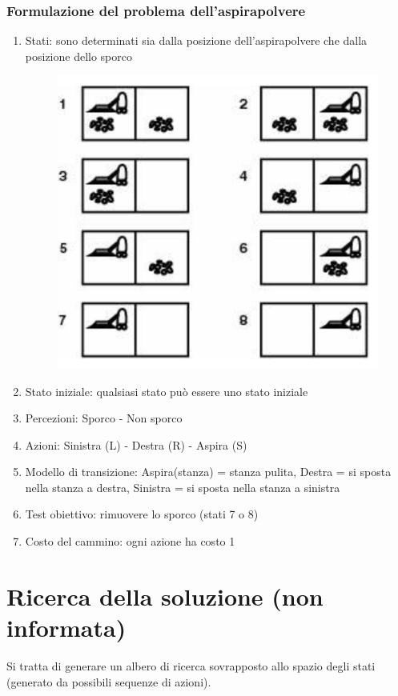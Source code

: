 \documentclass{article}
\begin{document}
\subsubsection{Formulazione del problema dell'aspirapolvere}
\begin{enumerate}
    \item Stati: sono determinati sia dalla posizione dell'aspirapolvere che dalla posizione dello sporco
        \begin{figure}[H]
            \centering
            \includegraphics[scale=0.25]{Images/statiaspirapolvere.png}
        \end{figure}
    \item Stato iniziale: qualsiasi stato può essere uno stato iniziale
    \item Percezioni: Sporco - Non sporco
    \item Azioni: Sinistra (L) - Destra (R) - Aspira (S)
    \item Modello di transizione: Aspira(stanza) = stanza pulita, Destra = si sposta nella stanza a destra, Sinistra = si sposta nella stanza a sinistra
    \item Test obiettivo: rimuovere lo sporco (stati 7 o 8)
    \item Costo del cammino: ogni azione ha costo 1
\end{enumerate}

\section{Ricerca della soluzione (non informata)}
Si tratta di generare un albero di ricerca sovrapposto allo spazio degli stati (generato da possibili sequenze di azioni).
\end{document}
